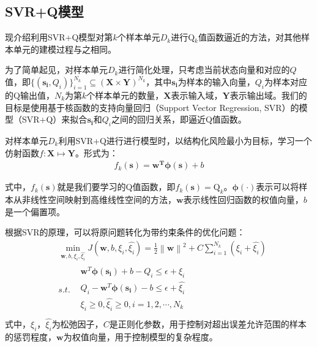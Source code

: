 \subsection{SVR+Q模型}
现介绍利用SVR+Q模型对第$k$个样本单元$D_{k}$进行Q$_{k}$值函数逼近的方法，对其他样本单元的建模过程与之相同。

为了简单起见，对样本单元$D_{k}$进行简化处理，只考虑当前状态向量和对应的$Q$值，即$\{(\mathbf{s_{i}}, Q_{i})\}_{i=1}^{N_{k}}\subseteq(\mathbf{X} \times \mathbf{Y})^{N_{k}}$，其中$\mathbf{s_{i}}$为样本的输入向量，$Q_{i}$为样本对应的Q输出值，$N_{k}$为第$k$个样本单元的数量，$\mathbf{X}$表示输入域，$\mathbf{Y}$表示输出域。我们的目标是使用基于核函数的支持向量回归（Support Vector Regression, SVR）的模型（SVR+Q）来拟合$\mathbf{s_{i}}$和$Q_{i}$之间的回归关系，即逼近Q值函数。

对样本单元$D_{k}$利用SVR+Q进行进行模型时，以结构化风险最小为目标，学习一个仿射函数$f:\mathbf{X} \mapsto \mathbf{Y}$。形式为：
\begin{equation}
\begin{aligned}
f_{k}(\mathbf{s})=\mathbf{w^{T}} \bm{\phi(s)} + b
\end{aligned}
\end{equation}

式中，$f_{k}(\mathbf{s})$就是我们要学习的Q值函数，即$f_{k}(\mathbf{s}) = \text{Q}_{k}$。$\bm{\phi(\cdot)}$表示可以将样本从非线性空间映射到高维线性空间的方法，$\mathbf{w}$表示线性回归函数的权值向量，$b$是一个偏置项。

根据SVR的原理，可以将原问题转化为带约束条件的优化问题：
\begin{equation}\label{seq_svr_ori}
\begin{split}
& \min_{\mathbf{w},b,\xi_{i},\hat{\xi_{i}}}  J(\mathbf{w},b,\xi_{i},\hat{\xi_{i}}) = \frac{1}{2} \left \| \mathbf{w} \right \|^{2} + C \sum_{i=1}^{N_{k}}(\xi_{i}+\hat{\xi_{i}})\\ 
& s.t. \begin{matrix}
&\mathbf{w}^{T} \bm{\phi(s_{i})} + b - Q_{i} \leqslant \epsilon + \xi_{i}\\
&Q_{i} - \mathbf{w}^{T} \bm{\phi(s_{i})} - b  \leqslant \epsilon + \hat{\xi_{i}} \\
&\xi_{i} \geqslant 0,\hat{\xi_{i}} \geqslant 0, i=1,2,\cdots,N_{k}\\
\end{matrix}
\end{split}
\end{equation}
式中，$\xi_{i}$，$\hat{\xi_{i}}$为松弛因子，$C$是正则化参数，用于控制对超出误差允许范围的样本的惩罚程度，$\mathbf{w}$为权值向量，用于控制模型的复杂程度。

